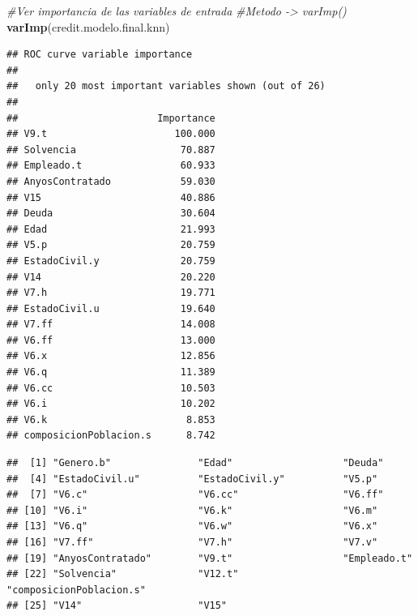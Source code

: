 \documentclass[
]{article}
\newenvironment{Shaded}{\begin{snugshade}}{\end{snugshade}}
\newcommand{\CommentTok}[1]{\textcolor[rgb]{0.56,0.35,0.01}{\textit{#1}}}
\newcommand{\FunctionTok}[1]{\textcolor[rgb]{0.13,0.29,0.53}{\textbf{#1}}}
\newcommand{\NormalTok}[1]{#1}
\begin{document}
\begin{Shaded}
\begin{Highlighting}[]
\CommentTok{\#Ver importancia de las variables de entrada}
\CommentTok{\#Metodo {-}\textgreater{} varImp()}
\FunctionTok{varImp}\NormalTok{(credit.modelo.final.knn)}
\end{Highlighting}
\end{Shaded}

\begin{verbatim}
## ROC curve variable importance
## 
##   only 20 most important variables shown (out of 26)
## 
##                        Importance
## V9.t                      100.000
## Solvencia                  70.887
## Empleado.t                 60.933
## AnyosContratado            59.030
## V15                        40.886
## Deuda                      30.604
## Edad                       21.993
## V5.p                       20.759
## EstadoCivil.y              20.759
## V14                        20.220
## V7.h                       19.771
## EstadoCivil.u              19.640
## V7.ff                      14.008
## V6.ff                      13.000
## V6.x                       12.856
## V6.q                       11.389
## V6.cc                      10.503
## V6.i                       10.202
## V6.k                        8.853
## composicionPoblacion.s      8.742
\end{verbatim}

\begin{Shaded}
\end{Shaded}

\begin{verbatim}
##  [1] "Genero.b"               "Edad"                   "Deuda"                 
##  [4] "EstadoCivil.u"          "EstadoCivil.y"          "V5.p"                  
##  [7] "V6.c"                   "V6.cc"                  "V6.ff"                 
## [10] "V6.i"                   "V6.k"                   "V6.m"                  
## [13] "V6.q"                   "V6.w"                   "V6.x"                  
## [16] "V7.ff"                  "V7.h"                   "V7.v"                  
## [19] "AnyosContratado"        "V9.t"                   "Empleado.t"            
## [22] "Solvencia"              "V12.t"                  "composicionPoblacion.s"
## [25] "V14"                    "V15"
\end{verbatim}
\end{document}
